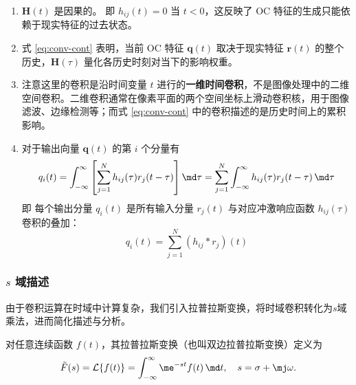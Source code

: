 \begin{remark}
    \begin{enumerate}
        \item \(\mathbf{H}(t)\) 是因果的。
              即 \(h_{ij}(t)=0\) 当 \(t<0\)，这反映了 OC 特征的生成只能依赖于现实特征的过去状态。
        \item 式 \eqref{eq:conv-cont} 表明，当前 OC 特征 $\mathbf{q}(t)$ 取决于现实特征 $\mathbf{r}(t)$ 的整个历史，$\mathbf{H}(\tau)$ 量化各历史时刻对当下的影响权重。
        \item 注意这里的卷积是沿时间变量 $t$ 进行的\textbf{一维时间卷积}，不是图像处理中的二维空间卷积。二维卷积通常在像素平面的两个空间坐标上滑动卷积核，用于图像滤波、边缘检测等；而式 \eqref{eq:conv-cont} 中的卷积描述的是历史时间上的累积影响。
        \item 对于输出向量 \(\mathbf{q}(t)\) 的第 \(i\) 个分量有
              \begin{equation}
                  q_i(t) = \int_{-\infty}^{\infty} \left[ \sum_{j=1}^{N} h_{ij}(\tau) r_j(t-\tau) \right] \md\tau
                  = \sum_{j=1}^{N} \int_{-\infty}^{\infty} h_{ij}(\tau) r_j(t-\tau) \, \md\tau
              \end{equation}
              即
              每个输出分量 \(q_i(t)\) 是所有输入分量 \(r_j(t)\) 与对应冲激响应函数 \(h_{ij}(\tau)\) 卷积的叠加：
              \begin{equation}
                  q_i(t) = \sum_{j=1}^{N} (h_{ij} * r_j)(t)
              \end{equation}
    \end{enumerate}
\end{remark}

\subsubsection{\texorpdfstring{$s$}{s} 域描述}

由于卷积运算在时域中计算复杂，我们引入拉普拉斯变换，将时域卷积转化为\(s\)域乘法，进而简化描述与分析。

\begin{definition}[拉普拉斯变换]
    对任意连续函数 $f(t)$，其拉普拉斯变换（也叫双边拉普拉斯变换）定义为
    \begin{equation}
        \tilde{F}(s)=\mathcal{L}\{f(t)\}=\int_{-\infty}^{\infty}\me^{-st}f(t)\,\md t,\quad s=\sigma+\mj\omega.
    \end{equation}
\end{definition}

